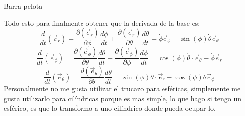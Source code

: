 \begin{solucion}{Barra pelota}
\begin{resumen}
Todo esto para finalmente obtener que la derivada de la base es:
$$\dfrac{d}{dt}(\vec{e}_r)=\dfrac{\partial(\vec{e}_r)}{\partial\phi}\dfrac{d\phi}{dt}+\dfrac{\partial(\vec{e}_r)}{\partial\theta}\dfrac{d\theta}{dt}=\dot{\phi}\vec{e}_{\phi}+\sin(\phi)\dot{\theta}\vec{e}_\theta$$
$$\dfrac{d}{dt}(\vec{e}_{\phi})=\dfrac{\partial(\vec{e}_{\phi})}{\partial\theta}\dfrac{d\theta}{dt}+\dfrac{\partial(\vec{e}_{\phi})}{\partial\phi}\dfrac{d\phi}{dt}=\cos(\phi)\dot{\theta}\cdot\vec{e}_\theta-\dot{\phi}\vec{e}_r$$
$$\dfrac{d}{dt}(\vec{e}_{\theta})=\dfrac{\partial(\vec{e}_{\theta})}{\partial\theta}\dfrac{d\theta}{dt}=\sin(\phi)\dot{\theta}\cdot\vec{e}_r-\cos(\phi)\dot{\theta}\vec{e}_{\phi}$$
Personalmente no me gusta utilizar el trucazo para esféricas, simplemente me gusta utilizarlo para cilíndricas porque es mas simple, lo que hago si tengo un esférico, es que lo transformo a uno cilíndrico donde pueda ocupar lo.
\end{resumen}
\end{solucion}

